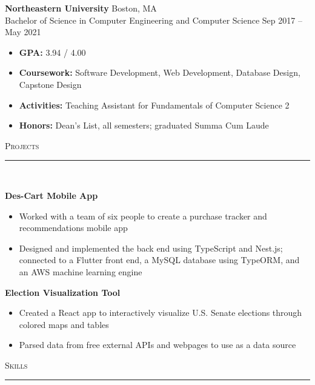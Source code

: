 \documentclass[11pt]{article}
\begin{document}
\begin{raggedright}
	\textbf{\large Northeastern University} \hfill Boston, MA \\
	Bachelor of Science in Computer Engineering and Computer Science \hfill Sep 2017 -- May 2021 \\
	\begin{itemize}
		\item \textbf{GPA:} 3.94 / 4.00
		\item \textbf{Coursework:} Software Development, Web Development, Database Design, Capstone Design
		\item \textbf{Activities:} Teaching Assistant for Fundamentals of Computer Science 2 \\
		\item \textbf{Honors:} Dean's List, all semesters; graduated Summa Cum Laude
	\end{itemize}
	\vspace{0.15in}
	
	
	\textsc{\Large Projects} \\
	\vspace{-0.1in}
	\rule{\textwidth}{0.4pt} \\
	\vspace{0.05in}
	
	\textbf{\large Des-Cart Mobile App} 
	\begin{itemize}
		\item Worked with a team of six people to create a purchase tracker and recommendations mobile app
		\item Designed and implemented the back end using TypeScript and Nest.js; connected to a Flutter front end, a MySQL database using TypeORM, and an AWS machine learning engine
	\end{itemize}
	\vspace{0.1in}
	
	\textbf{\large Election Visualization Tool} 
	\begin{itemize}
		\item Created a React app to interactively visualize U.S. Senate elections through colored maps and tables
		\item Parsed data from free external APIs and webpages to use as a data source
	\end{itemize}
	\vspace{0.15in}
	
	
	\textsc{\Large Skills} \\
	\vspace{-0.1in}
	\rule{\textwidth}{0.4pt} \\
	\vspace{0.05in}


\end{raggedright}
\end{document}
